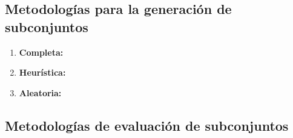 \subsection{Metodolog\'ias para la generaci\'on de subconjuntos}
\begin{enumerate}
\item \textbf{Completa:} 
\item \textbf{Heur\'istica:}
\item \textbf{Aleatoria:}
\end{enumerate}
\subsection{Metodolog\'ias de evaluaci\'on de subconjuntos}
